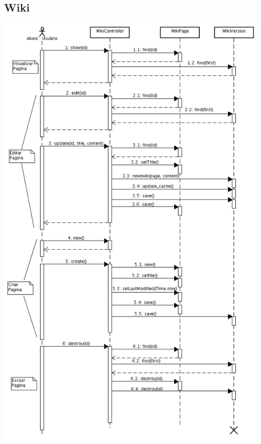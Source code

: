 \documentclass[11pt]{article}
\begin{document}
\subsection{Wiki}
\includegraphics[width=150truemm]{seq_wiki.png}
\end{document}
